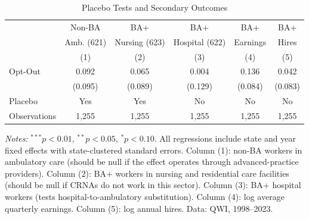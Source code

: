 
\begin{table}[htbp]
\centering
\caption{Placebo Tests and Secondary Outcomes}
\label{tab:placebo}
\begin{threeparttable}
\begin{tabular}{lccccc}
\toprule
 & Non-BA & BA+ & BA+ & BA+ & BA+ \\
 & Amb. (621) & Nursing (623) & Hospital (622) & Earnings & Hires \\
 & (1) & (2) & (3) & (4) & (5) \\
\midrule
Opt-Out & 0.092 & 0.065 & 0.004 & 0.136 & 0.042 \\
 & (0.095) & (0.089) & (0.129) & (0.084) & (0.083) \\
\addlinespace
Placebo & Yes & Yes & No & No & No \\
Observations & 1,255 & 1,255 & 1,255 & 1,255 & 1,255 \\
\bottomrule
\end{tabular}
\begin{tablenotes}[flushleft]
\small
\item \textit{Notes:} $^{***}p<0.01$, $^{**}p<0.05$, $^{*}p<0.10$. All regressions include state and year fixed effects with state-clustered standard errors. Column (1): non-BA workers in ambulatory care (should be null if the effect operates through advanced-practice providers). Column (2): BA+ workers in nursing and residential care facilities (should be null if CRNAs do not work in this sector). Column (3): BA+ hospital workers (tests hospital-to-ambulatory substitution). Column (4): log average quarterly earnings. Column (5): log annual hires. Data: QWI, 1998--2023.
\end{tablenotes}
\end{threeparttable}
\end{table}

